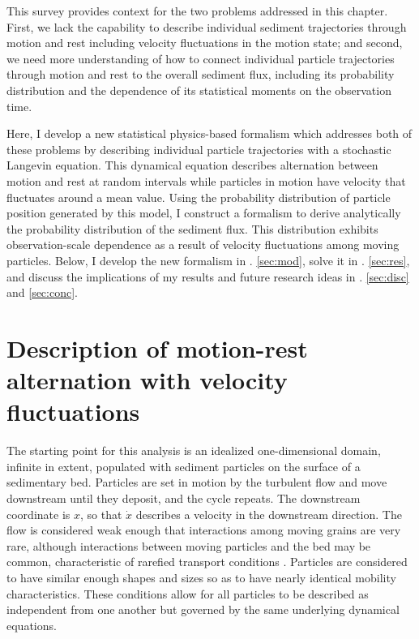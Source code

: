 This survey provides context for the two problems addressed in this chapter.
First, we lack the capability to describe individual sediment trajectories through motion and rest including velocity fluctuations in the motion state; and second, we need more understanding of how to connect individual particle trajectories through motion and rest to the overall \DIFdelbegin {}\DIFdelend \DIFaddbegin {}\DIFaddend sediment flux, including its probability distribution and the dependence of its statistical moments on the observation time.

Here, I develop a new statistical physics-based formalism which addresses both of these problems by describing individual particle trajectories with a stochastic Langevin equation.
This dynamical equation describes alternation between motion and rest at random intervals while particles in motion have velocity that fluctuates around a mean value.
Using the probability distribution of particle position generated by this model, I construct a formalism to derive analytically the probability distribution of the sediment flux.
This distribution exhibits observation-scale dependence as a result of velocity fluctuations among moving particles.
Below, I develop the new formalism in \DIFdelbegin {}\DIFdelend \DIFaddbegin {}\DIFaddend . \ref{sec:mod}, solve it in \DIFdelbegin {}\DIFdelend \DIFaddbegin {}\DIFaddend . \ref{sec:res}, and discuss the implications of my results and future research ideas in \DIFdelbegin {}\DIFdelend \DIFaddbegin {}\DIFaddend . \ref{sec:disc} and \ref{sec:conc}.

\section{Description of motion-rest alternation with velocity fluctuations \label{sec:mod}}
The starting point for this analysis is an idealized one-dimensional domain, infinite in extent, populated with sediment particles on the surface of a sedimentary bed.
Particles are set in motion by the turbulent flow and move downstream until they deposit, and the cycle repeats.
The downstream coordinate is $x$, so that $\dot{x}$ describes a velocity in the downstream direction.
The flow is considered weak enough that interactions among moving grains are very rare, although interactions between moving particles and the bed may be common, characteristic of rarefied transport conditions \citep[e.g.][]{Kumaran2006,Furbish2017}. 
Particles are considered to have similar enough shapes and sizes so as to have nearly identical mobility characteristics.
These conditions allow for all particles to be described as independent from one another but governed by the same underlying dynamical equations.

